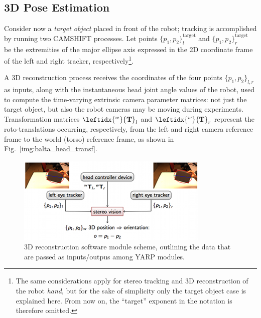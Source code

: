 
\subsection{3D Pose Estimation}

Consider now a \emph{target object} placed in front of the robot; tracking is accomplished by running two \ac{CAMSHIFT} processes. Let points $\{p_1, p_2\}_l^{\mathrm{target}}$ and $\{p_1, p_2\}_r^{\mathrm{target}}$ be the extremities of the major ellipse axis expressed in the 2D coordinate frame of the left and right tracker, respectively\footnote{The same considerations apply for stereo tracking and 3D reconstruction of the robot \emph{hand}, but for the sake of simplicity only the target object case is explained here. From now on, the ``target'' exponent in the notation is therefore omitted.}.

A 3D reconstruction process receives the coordinates of the four points $\{p_1, p_2 \}_{l,r}$ as inputs, along with the instantaneous head joint angle values of the robot, used to compute the time-varying extrinsic camera parameter matrices: not just the target object, but also the robot cameras may be moving during experiments. Transformation matrices $\leftidx{^w}{\mathbf{T}}_l$ and $ \leftidx{^w}{\mathbf{T}}_r$ represent the roto-translations occurring, respectively, from the left and right camera reference frame to the world (torso) reference frame, as shown in Fig.~\ref{img:balta_head_transf}.

\begin{figure}
\centering
\includegraphics{figures/recon_module}
\caption[3D reconstruction software module scheme]{3D reconstruction software module scheme, outlining the data that are passed as inputs/outpus among \ac{YARP} modules.}
\label{img:recon_module}
\end{figure}

